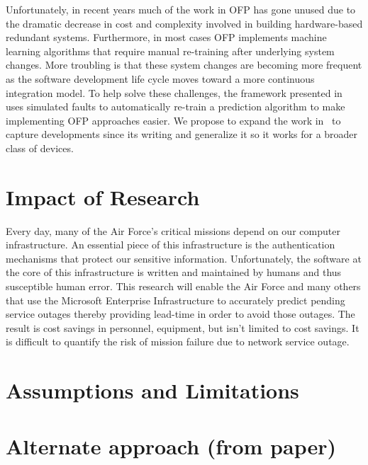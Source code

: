 Unfortunately, in recent years much of the work in OFP has gone unused due to
the dramatic decrease in cost and complexity involved in building
hardware-based redundant systems.  Furthermore, in most cases OFP implements
machine learning algorithms that require manual re-training after underlying
system changes.  More troubling is that these system changes are becoming more
frequent as the software development life cycle moves toward a more continuous
integration model.  To help solve these challenges, the framework presented
in~\cite{irrera2015} uses simulated faults to automatically re-train a
prediction algorithm to make implementing OFP approaches easier.  We propose to
expand the work in~\cite{irrera2015} to capture developments since its writing
and generalize it so it works for a broader class of devices.

\section{Impact of Research}
Every day, many of the Air Force's critical missions depend on our computer
infrastructure.  An essential piece of this infrastructure is the
authentication mechanisms that protect our sensitive information.
Unfortunately, the software at the core of this infrastructure is written and
maintained by humans and thus susceptible human error.  This research will
enable the Air Force and many others that use the Microsoft Enterprise
Infrastructure to accurately predict pending service outages thereby providing
lead-time in order to avoid those outages.  The result is cost savings in
personnel, equipment, but isn't limited to cost savings.  It is difficult to
quantify the risk of mission failure due to network service outage.

\section{Assumptions and Limitations}


\section{Alternate approach (from paper)}

